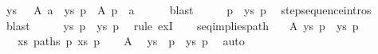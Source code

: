 \begin{isabellebody}
\ ys\ {\isasymalpha}\ \ A{}{\isacharcolon}{\kern0pt}\ {\isachardoublequoteopen}a\ {\isasymmapsto}{\isachardollar}{\kern0pt}\ ys\ p{\isacharprime}{\kern0pt}{\isacharprime}{\kern0pt}{\isachardoublequoteclose}\ \ A{}{\isacharcolon}{\kern0pt}\ {\isachardoublequoteopen}p\ {\isasymmapsto}{\isasymalpha}\ a{\isachardoublequoteclose}\isanewline
\ \ \ \ \isamarkupfalse%
\ blast\isanewline
\ \ \isamarkupfalse%
\ \isamarkupfalse%
\ {\isachardoublequoteopen}p\ {\isasymmapsto}{\isachardollar}{\kern0pt}\ {\isacharparenleft}{\kern0pt}{\isasymalpha}{\isacharhash}{\kern0pt}ys{\isacharparenright}{\kern0pt}\ p{\isacharprime}{\kern0pt}{\isacharprime}{\kern0pt}{\isachardoublequoteclose}\ \isamarkupfalse%
\ step{\isacharunderscore}{\kern0pt}sequence{\isachardot}{\kern0pt}intros{\isacharparenleft}{\kern0pt}{}{\isacharparenright}{\kern0pt}\isanewline
\ \ \ \ \isamarkupfalse%
\ blast\isanewline
\ \ \isamarkupfalse%
\ \isamarkupfalse%
\ {\isachardoublequoteopen}{\isasymexists}ys{\isachardot}{\kern0pt}\ p\ {\isasymmapsto}{\isachardollar}{\kern0pt}\ ys\ p{\isacharprime}{\kern0pt}{\isacharprime}{\kern0pt}{\isachardoublequoteclose}\ \isamarkupfalse%
\ {\isacharparenleft}{\kern0pt}rule\ exI{\isacharparenright}{\kern0pt}\isanewline
\ \ \isamarkupfalse%
\isanewline
{}\isamarkupfalse%
%
\endisatagproof
{\isafoldproof}%
%
\isadelimproof
\isanewline
%
\endisadelimproof
\isanewline
{}\isamarkupfalse%
\ seq{\isacharunderscore}{\kern0pt}implies{\isacharunderscore}{\kern0pt}path{\isacharcolon}{\kern0pt}\isanewline
\ \ \ A{}{\isacharcolon}{\kern0pt}\ {\isachardoublequoteopen}{\isasymexists}ys{\isachardot}{\kern0pt}\ p\ {\isasymmapsto}{\isachardollar}{\kern0pt}\ ys\ p{\isacharprime}{\kern0pt}{\isachardoublequoteclose}\isanewline
\ \ \ {\isachardoublequoteopen}{\isasymexists}xs{\isachardot}{\kern0pt}\ paths\ p\ xs\ p{\isacharprime}{\kern0pt}{\isachardoublequoteclose}\isanewline
%
\isadelimproof
%
\endisadelimproof
%
\isatagproof
{}\isamarkupfalse%
{\isacharminus}{\kern0pt}\isanewline
\ \ \isamarkupfalse%
\ A{}\ \isamarkupfalse%
\ ys\ \ {\isachardoublequoteopen}p\ {\isasymmapsto}{\isachardollar}{\kern0pt}\ ys\ p{\isacharprime}{\kern0pt}{\isachardoublequoteclose}\ \isamarkupfalse%
\ auto\isanewline
\ \ \isamarkupfalse%

\end{isabellebody}
